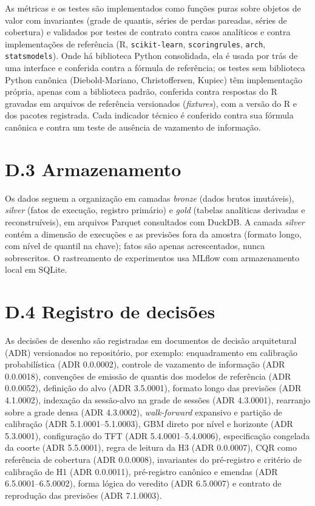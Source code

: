 As métricas e os testes são implementados como funções puras sobre objetos de valor com invariantes (grade de quantis, séries de perdas pareadas, séries de cobertura) e validados por testes de contrato contra casos analíticos e contra implementações de referência (R, \texttt{scikit-learn}, \texttt{scoringrules}, \texttt{arch}, \texttt{statsmodels}). Onde há biblioteca Python consolidada, ela é usada por trás de uma interface e conferida contra a fórmula de referência; os testes sem biblioteca Python canônica (Diebold-Mariano, Christoffersen, Kupiec) têm implementação própria, apenas com a biblioteca padrão, conferida contra respostas do R gravadas em arquivos de referência versionados (\textit{fixtures}), com a versão do R e dos pacotes registrada. Cada indicador técnico é conferido contra sua fórmula canônica e contra um teste de ausência de vazamento de informação.

\section*{D.3 Armazenamento}

Os dados seguem a organização em camadas \textit{bronze} (dados brutos imutáveis), \textit{silver} (fatos de execução, registro primário) e \textit{gold} (tabelas analíticas derivadas e reconstruíveis), em arquivos Parquet consultados com DuckDB. A camada \textit{silver} contém a dimensão de execuções e as previsões fora da amostra (formato longo, com nível de quantil na chave); fatos são apenas acrescentados, nunca sobrescritos. O rastreamento de experimentos usa MLflow com armazenamento local em SQLite.

\section*{D.4 Registro de decisões}

As decisões de desenho são registradas em documentos de decisão arquitetural (ADR) versionados no repositório, por exemplo: enquadramento em calibração probabilística (ADR 0.0.0002), controle de vazamento de informação (ADR 0.0.0018), convenções de emissão de quantis dos modelos de referência (ADR 0.0.0052), definição do alvo (ADR 3.5.0001), formato longo das previsões (ADR 4.1.0002), indexação da sessão-alvo na grade de sessões (ADR 4.3.0001), rearranjo sobre a grade densa (ADR 4.3.0002), \textit{walk-forward} expansivo e partição de calibração (ADR 5.1.0001--5.1.0003), GBM direto por nível e horizonte (ADR 5.3.0001), configuração do TFT (ADR 5.4.0001--5.4.0006), especificação congelada da coorte (ADR 5.5.0001), regra de leitura da H3 (ADR 0.0.0007), CQR como referência de cobertura (ADR 0.0.0008), invariantes do pré-registro e critério de calibração de H1 (ADR 0.0.0011), pré-registro canônico e emendas (ADR 6.5.0001--6.5.0002), forma lógica do veredito (ADR 6.5.0007) e contrato de reprodução das previsões (ADR 7.1.0003).


